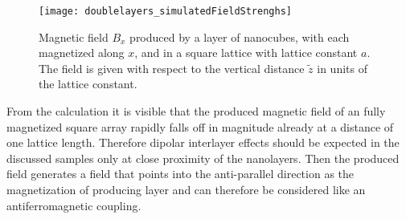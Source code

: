 \documentclass[\main/dresen_thesis.tex]{subfiles}
\begin{document}
  \begin{figure}[tb]
    \centering
    \texttt{[image: doublelayers\_simulatedFieldStrenghs]}
    \caption{\label{fig:doubleLayers:layerMagneticField}Magnetic field $B_x$ produced by a layer of nanocubes, with each magnetized along $x$, and in a square lattice with lattice constant $a$. The field is given with respect to the vertical distance $\tilde{z}$ in units of the lattice constant.}
  \end{figure}

  From the calculation it is visible that the produced magnetic field of an fully magnetized square array rapidly falls off in magnitude already at a distance of one lattice length.
  Therefore dipolar interlayer effects should be expected in the discussed samples only at close proximity of the nanolayers.
  Then the produced field generates a field that points into the anti-parallel direction as the magnetization of producing layer and can therefore be considered like an antiferromagnetic coupling.
\end{document}
